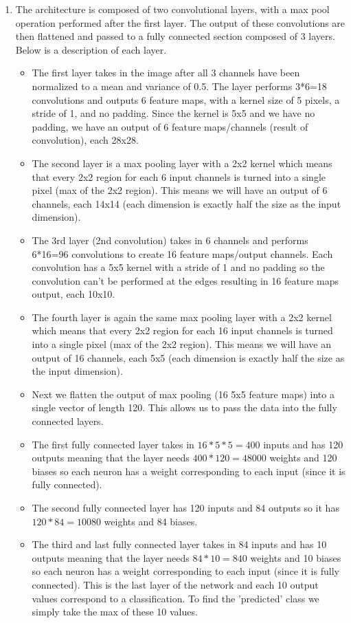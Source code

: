 \documentclass[answers]{exam}
\begin{document}
\begin{solution}
\begin{enumerate}
    \item The architecture is composed of two convolutional layers, with a max pool operation performed after the first layer. The output of these convolutions are then flattened and passed to a fully connected section composed of 3 layers. Below is a description of each layer.
    
    \begin{itemize}
        \item The first layer takes in the image after all 3 channels have been normalized to a mean and variance of 0.5. The layer performs 3*6=18 convolutions and outputs 6 feature maps, with a kernel size of 5 pixels, a stride of 1, and no padding. Since the kernel is 5x5 and we have no padding, we have an output of 6 feature maps/channels  (result of convolution), each 28x28.
        \item The second layer is a max pooling layer with a 2x2 kernel which means that every 2x2 region for each 6 input channels is turned into a single pixel (max of the 2x2 region). This means we will have an output of 6 channels, each 14x14 (each dimension is exactly half the size as the input dimension).
        \item The 3rd layer (2nd convolution) takes in 6 channels and performs 6*16=96 convolutions to create 16 feature maps/output channels. Each convolution has a 5x5 kernel with a stride of 1 and no padding so the convolution can't be performed at the edges resulting in 16 feature maps output, each 10x10.
        \item The fourth layer is again the same max pooling layer with a 2x2 kernel which means that every 2x2 region for each 16 input channels is turned into a single pixel (max of the 2x2 region). This means we will have an output of 16 channels, each 5x5 (each dimension is exactly half the size as the input dimension).
         \item Next we flatten the output of max pooling (16 5x5 feature maps) into a single vector of length 120. This allows us to pass the data into the fully connected layers.
        \item The first fully connected layer takes in $16*5*5=400$ inputs and has 120 outputs meaning that the layer needs $400 * 120=48000$ weights and 120 biases so each neuron has a weight corresponding to each input (since it is fully connected).
         \item The second fully connected layer has 120 inputs and 84 outputs so it has $120*84=10080$ weights and 84 biases.
        \item The third and last fully connected layer takes in 84 inputs and has 10 outputs meaning that the layer needs $84 * 10 = 840$ weights and 10 biases so each neuron has a weight corresponding to each input (since it is fully connected). This is the last layer of the network and each 10 output values correspond to a classification. To find the 'predicted' class we simply take the max of these 10 values.
      \end{itemize}
      

\end{enumerate}
\end{solution}
\end{document}
